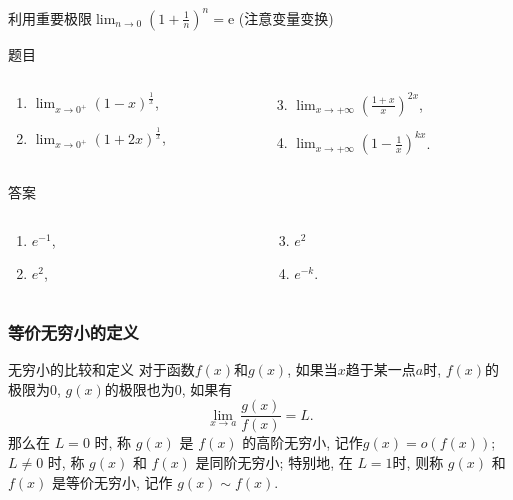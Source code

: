 \documentclass[
10pt,
aspectratio=43,
]{beamer}
\begin{document}
\begin{frame}{利用重要极限$\displaystyle\lim_{n\to0}(1+\frac{1}{n})^n=\mathrm{e}$ (注意变量变换)}
	\begin{block}{题目}
		\begin{columns}[onlytextwidth]
			\begin{column}{0.5\textwidth}
				\begin{enumerate}
					\item $\displaystyle\lim _{x \rightarrow 0^+}(1-x)^{\frac{1}{x}}$,
					\item $\displaystyle\lim _{x \rightarrow 0^+}(1+2 x)^{\frac{1}{x}}$,
				\end{enumerate}
			\end{column}
			\begin{column}{0.5\textwidth}
				\begin{enumerate}
					\setcounter{enumi}{2}
					\item $\displaystyle\lim _{x \rightarrow +\infty}\left(\frac{1+x}{x}\right)^{2 x}$,
					\item $\displaystyle\lim _{x \rightarrow +\infty}\left(1-\frac{1}{x}\right)^{k x}$.
				\end{enumerate}
			\end{column}
		\end{columns}
	\end{block}
	\begin{exampleblock}{答案}
		\begin{columns}[onlytextwidth]
			\begin{column}{0.5\textwidth}
				\begin{enumerate}
					\item $e^{-1}$,
					      \pause
					\item $e^2$,
				\end{enumerate}
			\end{column}
			\begin{column}{0.5\textwidth}
				\begin{enumerate}
					\setcounter{enumi}{2}
					\pause
					\item $e^2$
					      \pause
					\item $e^{-k}$.
				\end{enumerate}
			\end{column}
		\end{columns}
	\end{exampleblock}
\end{frame}

\begin{frame}
	\frametitle{等价无穷小的定义}
	\begin{block}{无穷小的比较和定义}
		对于函数$f(x)$和$g(x)$, 如果当$x$趋于某一点$a$时, $f(x)$的极限为$0$, $g(x)$的极限也为$0$, 如果有
		\[
			\lim_{x\to a}\frac{g(x)}{f(x)}=L.
		\]
		那么在 $L=0$ 时, 称 $g(x)$ 是 $f(x)$ 的高阶无穷小, 记作$g(x)= o(f(x))$; $L\neq0$ 时, 称 $g(x)$ 和 $f(x)$ 是同阶无穷小; 特别地, 在 $L=1$时, 则称 $g(x)$ 和 $f(x)$ 是等价无穷小, 记作 $g(x)\sim f(x)$.
	\end{block}
\end{frame}
\end{document}
